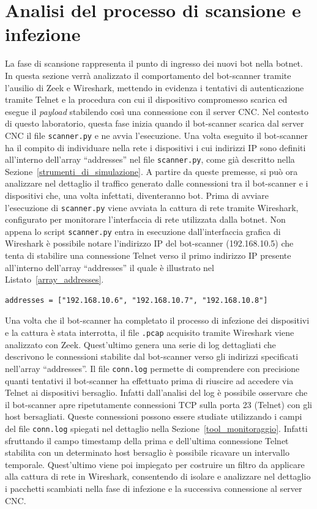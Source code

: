 \section{Analisi del processo di scansione e infezione}
La fase di scansione rappresenta il punto di ingresso dei nuovi bot nella botnet. In questa sezione verrà analizzato il comportamento del bot-scanner tramite l'ausilio di Zeek e Wireshark, mettendo in evidenza i tentativi di autenticazione tramite Telnet e la procedura con cui il dispositivo compromesso scarica ed esegue il \emph{payload} stabilendo così una connessione con il server CNC. Nel contesto di questo laboratorio, questa fase inizia quando il bot-scanner scarica dal server CNC il file \texttt{scanner.py} e ne avvia l'esecuzione. Una volta eseguito il bot-scanner ha il compito di individuare nella rete i dispositivi i cui indirizzi IP sono definiti all'interno dell'array ``addresses'' nel file \texttt{scanner.py}, come già descritto nella Sezione~\ref{strumenti_di_simulazione}. A partire da queste premesse, si può ora analizzare nel dettaglio il traffico generato dalle connessioni tra il  bot-scanner e i dispositivi che, una volta infettati, diventeranno bot. Prima di avviare l'esecuzione di \texttt{scanner.py} viene avviata la cattura di rete tramite Wireshark, configurato per monitorare l'interfaccia di rete utilizzata dalla botnet. Non appena lo script \texttt{scanner.py} entra in esecuzione dall'interfaccia grafica di Wireshark è possibile notare l'indirizzo IP del bot-scanner (192.168.10.5) che tenta di stabilire una connessione Telnet verso il primo indirizzo IP presente all'interno dell'array ``addresses'' il quale è illustrato nel Listato~\ref{array_addresses}.
\begin{lstlisting}[caption={Array ``addresses'' in \texttt{scanner.py}.}, label={array_addresses}]
    addresses = ["192.168.10.6", "192.168.10.7", "192.168.10.8"]
\end{lstlisting}
Una volta che il bot-scanner ha completato il processo di infezione dei dispositivi e la cattura è stata interrotta, il file \texttt{.pcap} acquisito tramite Wireshark viene analizzato con Zeek. Quest'ultimo genera una serie di log dettagliati che descrivono le connessioni stabilite dal bot-scanner verso gli indirizzi specificati nell'array ``addresses''. Il file \texttt{conn.log} permette di comprendere con precisione quanti tentativi il bot-scanner ha effettuato prima di riuscire ad accedere via Telnet ai dispositivi bersaglio. Infatti dall'analisi del log è possibile osservare che il bot-scanner apre ripetutamente connessioni TCP sulla porta 23 (Telnet) con gli host bersagliati. Queste connessioni possono essere studiate utilizzando i campi del file \texttt{conn.log} spiegati nel dettaglio nella Sezione~\ref{tool_monitoraggio}. Infatti sfruttando il campo timestamp della prima e dell'ultima connessione Telnet stabilita con un determinato host bersaglio è possibile ricavare un intervallo temporale. Quest'ultimo viene poi impiegato per costruire un filtro da applicare alla cattura di rete in Wireshark, consentendo di isolare e analizzare nel dettaglio i pacchetti scambiati nella fase di infezione e la successiva connessione al server CNC.
